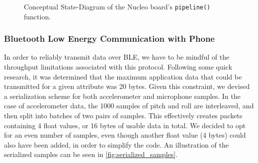\begin{figure}[h]
\centering
{}
\caption{Conceptual State-Diagram of the Nucleo board's \texttt{pipeline()} function.}
\label{fig:nucleo_pipeline}
\end{figure}

\subsubsection{Bluetooth Low Energy Communication with Phone}

In order to reliably transmit data over BLE, we have to be mindful of the throughput limitations associated with this protocol. Following some quick research, it was determined that the maximum application data that could be transmitted for a given attribute was 20 bytes\cite{blethroughput}. Given this constraint, we devised a serialization scheme for both accelerometer and microphone samples. In the case of accelerometer data, the 1000 samples of pitch and roll are interleaved, and then split into batches of two pairs of samples. This effectively creates packets containing 4 float values, or 16 bytes of usable data in total. We decided to opt for an even number of samples, even though another float value (4 bytes) could also have been added, in order to simplify the code. An illustration of the serialized samples can be seen in \autoref{fig:serialized_samples}.

